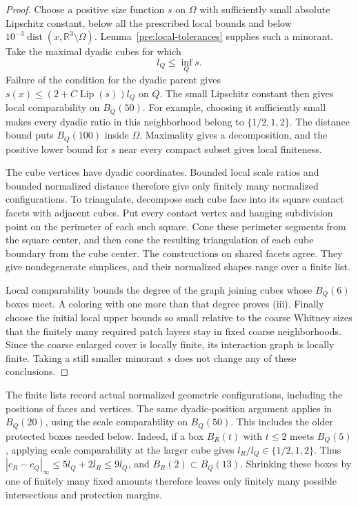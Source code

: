 \documentclass[11pt]{article}
\numberwithin{equation}{section}
\theoremstyle{definition}
\theoremstyle{remark}
\newcommand{\R}{\mathbb R}
\DeclareMathOperator{\Lip}{Lip}
\DeclareMathOperator{\dist}{dist}
\begin{document}
\begin{proof}
Choose a positive size function $s$ on $\Omega$ with sufficiently
small absolute Lipschitz constant, below all the prescribed local
bounds and below $10^{-3}\dist(x,\R^3\setminus\Omega)$.
Lemma~\ref{pre:local-tolerances} supplies such a minorant.  Take the
maximal dyadic cubes for which
\[
 l_Q\le\inf_Qs.
\]
Failure of the condition for the dyadic parent gives
$s(x)\le(2+C\Lip(s))l_Q$ on $Q$.  The small Lipschitz constant
then gives local comparability on $B_Q(50)$.  For example, choosing
it sufficiently small makes every dyadic ratio in this neighborhood
belong to $\{1/2,1,2\}$.  The distance bound puts $B_Q(100)$ inside
$\Omega$.  Maximality gives a decomposition, and the positive lower
bound for $s$ near every compact subset gives local finiteness.

The cube vertices have dyadic coordinates.  Bounded local scale
ratios and bounded normalized distance therefore give only finitely
many normalized configurations.  To triangulate, decompose each
cube face into its square contact facets with adjacent cubes.
Put every contact vertex and hanging subdivision point on the
perimeter of each such square.  Cone these perimeter segments from
the square center, and then cone the resulting triangulation of
each cube boundary from the cube center.  The constructions on
shared facets agree.  They give nondegenerate simplices, and their
normalized shapes range over a finite list.

Local comparability bounds the degree of the graph joining cubes
whose $B_Q(6)$ boxes meet.  A coloring with one more than that
degree proves \textup{(iii)}.  Finally choose the initial local
upper bounds so small relative to the coarse Whitney sizes that
the finitely many required patch layers stay in fixed coarse
neighborhoods.  Since the coarse enlarged cover is locally finite,
its interaction graph is locally finite.  Taking a still smaller
minorant $s$ does not change any of these conclusions.
\end{proof}

The finite lists record actual normalized geometric configurations,
including the positions of faces and vertices.  The same
dyadic-position argument applies in $B_Q(20)$, using the scale
comparability on $B_Q(50)$.  This includes the older protected
boxes needed below.  Indeed, if a box $B_R(t)$ with $t\le2$ meets
$B_Q(5)$, applying scale comparability at the larger cube gives
$l_R/l_Q\in\{1/2,1,2\}$.  Thus
$|c_R-c_Q|_\infty\le5l_Q+2l_R\le9l_Q$, and
$B_R(2)\subset B_Q(13)$.  Shrinking these boxes by one of
finitely many fixed amounts therefore leaves only finitely many
possible intersections and protection margins.
\end{document}
